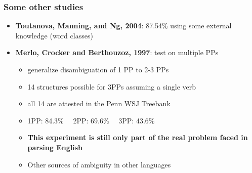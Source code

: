 \begin{frame}
\frametitle{Some other studies}
  \begin{itemize}
  \item {\bf Toutanova, Manning, and Ng, 2004}: 87.54\% using some external knowledge (word classes)
  \item {\bf Merlo, Crocker and Berthouzoz, 1997}: test on multiple PPs
  \begin{itemize}
	\item generalize disambiguation of 1 PP to 2-3 PPs
	\item 14 structures possible for 3PPs assuming a single verb
	\item all 14 are attested in the Penn WSJ Treebank
	\item 1PP: 84.3\% \ \ 2PP: 69.6\% \ \ 3PP: 43.6\% 
	\item {\bf This experiment is still only part of the real problem faced in parsing English}
	\item Other sources of ambiguity in other languages
  \end{itemize}
  \end{itemize}

\end{frame}


